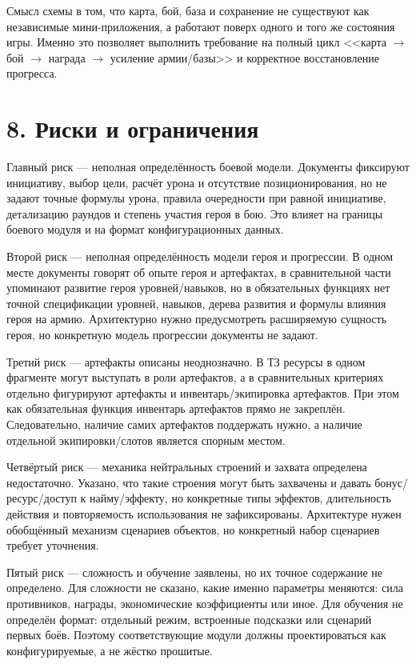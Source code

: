 \documentclass[12pt,a4paper]{article}
\begin{document}
Смысл схемы в том, что карта, бой, база и сохранение не существуют как независимые мини-приложения, а работают поверх одного и того же состояния игры. Именно это позволяет выполнить требование на полный цикл <<карта $\rightarrow$ бой $\rightarrow$ награда $\rightarrow$ усиление армии/базы>> и корректное восстановление прогресса.

\section*{8. Риски и ограничения}

Главный риск --- неполная определённость боевой модели. Документы фиксируют инициативу, выбор цели, расчёт урона и отсутствие позиционирования, но не задают точные формулы урона, правила очередности при равной инициативе, детализацию раундов и степень участия героя в бою. Это влияет на границы боевого модуля и на формат конфигурационных данных.

Второй риск --- неполная определённость модели героя и прогрессии. В одном месте документы говорят об опыте героя и артефактах, в сравнительной части упоминают развитие героя уровней/навыков, но в обязательных функциях нет точной спецификации уровней, навыков, дерева развития и формулы влияния героя на армию. Архитектурно нужно предусмотреть расширяемую сущность героя, но конкретную модель прогрессии документы не задают.

Третий риск --- артефакты описаны неоднозначно. В ТЗ ресурсы в одном фрагменте могут выступать в роли артефактов, а в сравнительных критериях отдельно фигурируют артефакты и инвентарь/экипировка артефактов. При этом как обязательная функция инвентарь артефактов прямо не закреплён. Следовательно, наличие самих артефактов поддержать нужно, а наличие отдельной экипировки/слотов является спорным местом.

Четвёртый риск --- механика нейтральных строений и захвата определена недостаточно. Указано, что такие строения могут быть захвачены и давать бонус/ресурс/доступ к найму/эффекту, но конкретные типы эффектов, длительность действия и повторяемость использования не зафиксированы. Архитектуре нужен обобщённый механизм сценариев объектов, но конкретный набор сценариев требует уточнения.

Пятый риск --- сложность и обучение заявлены, но их точное содержание не определено. Для сложности не сказано, какие именно параметры меняются: сила противников, награды, экономические коэффициенты или иное. Для обучения не определён формат: отдельный режим, встроенные подсказки или сценарий первых боёв. Поэтому соответствующие модули должны проектироваться как конфигурируемые, а не жёстко прошитые.
\end{document}
